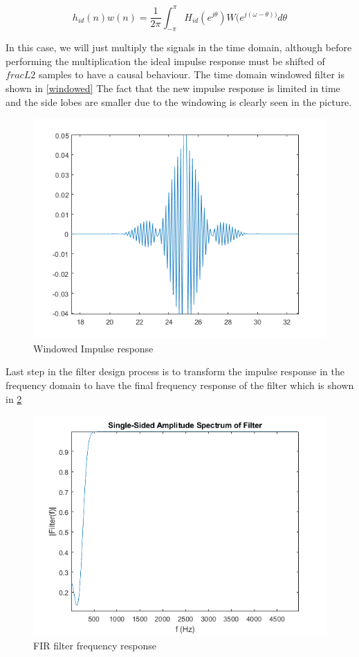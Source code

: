 \documentclass[12pt,a4paper,twoside]{article}
\begin{document}
$$h_{id}(n)w(n) = \frac{1}{2\pi}\int_{-\pi}^{\pi} H_{id}(e^{j\theta})W(e^{j(\omega - \theta))} d\theta $$

In this case, we will just multiply the signals in the time domain, although before performing the multiplication the ideal impulse response must be shifted of $frac{L}{2}$ samples to have a causal behaviour. The time domain windowed filter is shown in \figurename{ \ref{windowed}} The fact that the new impulse response is limited in time and the side lobes are smaller due to the windowing is clearly seen in the picture.

\begin{figure}[h!]
	\centering
	\includegraphics[width=0.8\linewidth]{Images/windowed.png}
	\caption{Windowed Impulse response}
	\label{gauss}
\end{figure}
\noindent

Last step in the filter design process is to transform the impulse response in the frequency domain to have the final frequency response of the filter which is shown in \figurename{ \ref{filterresp}}

\begin{figure}[h!]
	\centering
	\includegraphics[width=0.8\linewidth]{Images/filterresp.png}
	\caption{FIR filter frequency response}
	\label{filterresp}
\end{figure}
\noindent
\end{document}
